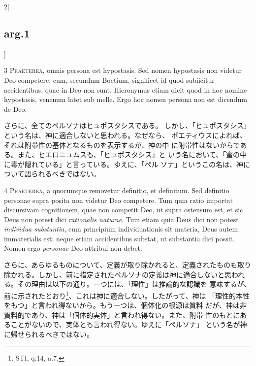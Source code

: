 \documentclass[paper=a4paper,fontsize=10pt,jafontsize=9pt,titlepage]{jlreq}
\begin{document}
\begin{paracol}{2}[\subsection{arg.1}]

3 {\scshape Praeterea}, omnis persona est hypostasis. Sed nomen hypostasis non
videtur Deo competere, cum, secundum Boetium, significet id quod
subiicitur accidentibus, quae in Deo non sunt. Hieronymus etiam dicit
quod in hoc nomine hypostasis, venenum latet sub melle. Ergo hoc nomen
persona non est dicendum de Deo.

\switchcolumn

さらに、全てのペルソナはヒュポスタシスである。
しかし、「ヒュポスタシス」という名は、神に適合しないと思われる。なぜなら、
 ボエティウスによれば、それは附帯性の基体となるものを表示するが、神の中
 に附帯性はないからである。また、ヒエロニュムスも、「ヒュポスタシス」と
 いう名において、「蜜の中に毒が隠れている」と言っている。ゆえに、「ペル
 ソナ」というこの名は、神について語られるべきではない。


4 {\scshape Praeterea}, a quocumque removetur definitio, et definitum. Sed definitio
personae supra posita non videtur Deo competere. Tum quia ratio importat
discursivam cognitionem, quae non competit Deo, ut supra ostensum est,
et sic Deus non potest dici {\itshape rationalis naturae}. Tum etiam quia Deus dici
non potest {\itshape individua substantia}, cum principium individuationis sit
materia, Deus autem immaterialis est; neque etiam accidentibus substat,
ut substantia dici possit. Nomen ergo {\itshape personae} Deo attribui non debet.

\switchcolumn

さらに、あらゆるものについて、定義が取り除かれると、定義されたものも取り
 除かれる。しかし、前に措定されたペルソナの定義は神に適合しないと思われ
 る。その理由は以下の通り。一つには、「理性」は推論的な認識を
 意味するが、前に示されたとおり\footnote{STI, q.14, a.7.}、これは神に適合しない。したがって、神は
 「理性的本性をもつ」と言われ得ないから。もう一つは、個体化の根源は質料
 だが、神は非質料的であり、神は「個体的実体」と言われ得ない。また、附帯
 性のもとにあることがないので、実体とも言われ得ない。ゆえに「ペルソナ」
 という名が神に帰せられるべきではない。

\switchcolumn*[\subsection{s.c.}]


\end{paracol}
\end{document}
